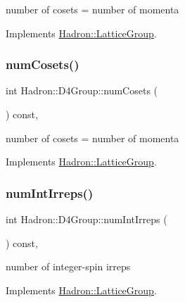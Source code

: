 number of cosets = number of momenta 

Implements \mbox{\hyperlink{structHadron_1_1LatticeGroup_afc76430f36a3a041f86d4058c59bf55e}{Hadron\+::\+Lattice\+Group}}.

\mbox{\label{structHadron_1_1D4Group_a97eed87299880400afc5e9bb1ee222bc}} 
\subsubsection{\texorpdfstring{numCosets()}{numCosets()}\hspace{0.1cm}{\footnotesize\ttfamily [3/3]}}
{\footnotesize\ttfamily int Hadron\+::\+D4\+Group\+::num\+Cosets (\begin{DoxyParamCaption}{ }\end{DoxyParamCaption}) const\hspace{0.3cm}{\ttfamily [inline]}, {\ttfamily [virtual]}}

number of cosets = number of momenta 

Implements \mbox{\hyperlink{structHadron_1_1LatticeGroup_afc76430f36a3a041f86d4058c59bf55e}{Hadron\+::\+Lattice\+Group}}.

\mbox{\label{structHadron_1_1D4Group_a814de4e3ea523397868aee44d639c5cf}} 
\subsubsection{\texorpdfstring{numIntIrreps()}{numIntIrreps()}\hspace{0.1cm}{\footnotesize\ttfamily [1/3]}}
{\footnotesize\ttfamily int Hadron\+::\+D4\+Group\+::num\+Int\+Irreps (\begin{DoxyParamCaption}{ }\end{DoxyParamCaption}) const\hspace{0.3cm}{\ttfamily [inline]}, {\ttfamily [virtual]}}

number of integer-\/spin irreps 

Implements \mbox{\hyperlink{structHadron_1_1LatticeGroup_af2aa7b39222bf188389356eefcef7547}{Hadron\+::\+Lattice\+Group}}.

\mbox{\label{structHadron_1_1D4Group_a814de4e3ea523397868aee44d639c5cf}} 
